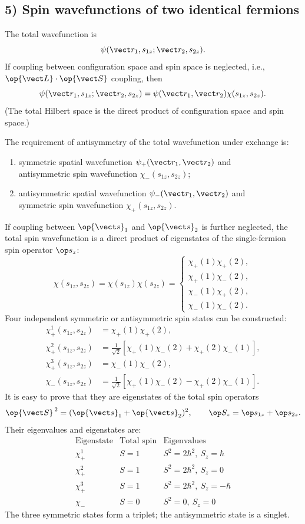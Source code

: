 \subsection*{5) Spin wavefunctions of two identical fermions}
The total wavefunction is
\[\psi(\vect r_1,s_{1z};\vect r_2,s_{2z}).\]
If coupling between configuration space and spin space is neglected, i.e., $\op{\vect L}\cdot\op{\vect S}$ coupling, then
\[\psi(\vect r_1,s_{1z};\vect r_2,s_{2z})
=\psi(\vect r_1,\vect r_2)\chi(s_{1z},s_{2z}).\]
(The total Hilbert space is the direct product of configuration space and spin space.)

The requirement of antisymmetry of the total wavefunction under exchange is:
\begin{enumerate}[label=\alph*)]
\item symmetric spatial wavefunction $\psi_+(\vect r_1,\vect r_2)$ and\\ antisymmetric spin wavefunction $\chi_-(s_{1z},s_{2z})$;
\item antisymmetric spatial wavefunction $\psi_-(\vect r_1,\vect r_2)$ and\\ symmetric spin wavefunction $\chi_+(s_{1z},s_{2z})$.
\end{enumerate}
If coupling between $\op{\vect s}_1$ and $\op{\vect s}_2$ is further neglected, the total spin wavefunction is a direct product of eigenstates of the single-fermion spin operator $\op s_z$:
\[\chi(s_{1z},s_{2z})=\chi(s_{1z})\chi(s_{2z})
=\begin{cases}
\chi_+(1)\chi_+(2),\\
\chi_+(1)\chi_-(2),\\
\chi_-(1)\chi_+(2),\\
\chi_-(1)\chi_-(2).
\end{cases}\]
Four independent symmetric or antisymmetric spin states can be constructed:
\begin{align*}
\chi_+^1(s_{1z},s_{2z})&=\chi_+(1)\chi_+(2),\\
\chi_+^2(s_{1z},s_{2z})&=\frac1{\sqrt2}
[\chi_+(1)\chi_-(2)+\chi_+(2)\chi_-(1)],\\
\chi_+^3(s_{1z},s_{2z})&=\chi_-(1)\chi_-(2),\\
\chi_-(s_{1z},s_{2z})&=\frac1{\sqrt2}
[\chi_+(1)\chi_-(2)-\chi_+(2)\chi_-(1)].
\end{align*}
It is easy to prove that they are eigenstates of the total spin operators
\[\op{\vect S}^{\,2}=(\op{\vect s}_1+\op{\vect s}_2)^2,
\qquad\op S_z=\op s_{1z}+\op s_{2z}.\]
Their eigenvalues and eigenstates are:
\[
\begin{array}{c|c|c}
\text{Eigenstate}&\text{Total spin}&\text{Eigenvalues}\\\hline
\chi_+^1&S=1&S^2=2\hbar^2,\ S_z=\hbar\\
\chi_+^2&S=1&S^2=2\hbar^2,\ S_z=0\\
\chi_+^3&S=1&S^2=2\hbar^2,\ S_z=-\hbar\\
\chi_-&S=0&S^2=0,\ S_z=0
\end{array}
\]
The three symmetric states form a triplet; the antisymmetric state is a singlet.

